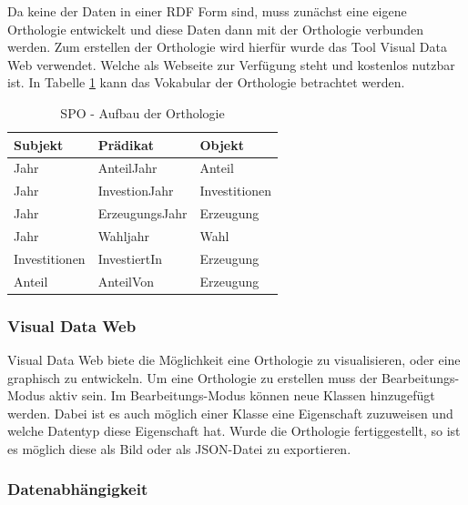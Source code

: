 \documentclass[12pt]{article}
\begin{document}
Da keine der Daten in einer RDF Form sind, muss zunächst eine eigene Orthologie entwickelt und diese Daten dann mit der Orthologie verbunden werden. Zum erstellen der Orthologie wird hierfür wurde das Tool Visual Data Web verwendet. Welche als Webseite zur Verfügung steht und kostenlos nutzbar ist. In Tabelle \ref{fig:table} kann das Vokabular der Orthologie betrachtet werden. 
    
\begin{table}[]
\caption{SPO - Aufbau der Orthologie}
\begin{tabular}{|l|l|l|}
\hline
\textbf{Subjekt} & \textbf{Prädikat} & \textbf{Objekt} \\ \hline
Jahr             & AnteilJahr        & Anteil          \\ \hline
Jahr             & InvestionJahr     & Investitionen   \\ \hline
Jahr             & ErzeugungsJahr    & Erzeugung       \\ \hline
Jahr             & Wahljahr          & Wahl            \\ \hline
Investitionen    & InvestiertIn      & Erzeugung       \\ \hline
Anteil           & AnteilVon         & Erzeugung       \\ \hline
\end{tabular}
\label{fig:table}
\end{table}

        \subsubsection{Visual Data Web}
        
Visual Data Web biete die Möglichkeit eine Orthologie zu visualisieren, oder eine graphisch zu entwickeln. Um eine Orthologie zu erstellen muss der Bearbeitungs-Modus aktiv sein. Im Bearbeitungs-Modus können neue Klassen hinzugefügt werden. Dabei ist es auch möglich einer Klasse eine Eigenschaft zuzuweisen und welche Datentyp diese Eigenschaft hat. Wurde die Orthologie fertiggestellt, so ist es möglich diese als Bild oder als JSON-Datei zu exportieren. 
        
        \subsubsection{Datenabhängigkeit}
    
\end{document}
